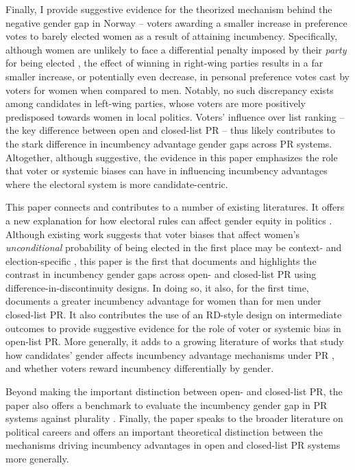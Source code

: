 \documentclass[12pt]{article}
\begin{document}
Finally, I provide suggestive evidence for the theorized mechanism behind the negative gender gap in Norway -- voters awarding a smaller increase in preference votes to barely elected women as a result of attaining incumbency.
Specifically, although women are unlikely to face a differential penalty imposed by their \emph{party} for being elected \citep{kjaer2019}, the effect of winning in right-wing parties results in a far smaller increase, or potentially even decrease, in personal preference votes cast by voters for women when compared to men. Notably, no such discrepancy exists among candidates in left-wing parties, whose voters are more positively predisposed towards women in local politics. Voters' influence over list ranking -- the key difference between open and closed-list PR -- thus likely contributes to the stark difference in incumbency advantage gender gaps across PR systems. Altogether, although suggestive, the evidence in this paper emphasizes the role that voter or systemic biases can have in influencing incumbency advantages where the electoral system is more candidate-centric.

This paper connects and contributes to a number of existing literatures. It offers a new explanation for how electoral rules can affect gender equity in politics \citep{krook2014,obrien2016,krook2018,luhiste2015}.
Although existing work suggests that voter biases that affect women's \emph{unconditional} probability of being elected in the first place may be context- and election-specific \citep{folke2016a, anzia2019, beaman2009,broockman2020,eymmoud2017}, this paper is the first that documents and highlights the contrast in incumbency gender gaps across open- and closed-list PR using difference-in-discontinuity designs. In doing so, it also, for the first time, documents a greater incumbency advantage for women than for men under closed-list PR. It also contributes the use of an RD-style design on intermediate outcomes to provide suggestive evidence for the role of voter or systemic bias in open-list PR. More generally, it adds to a growing literature of works that study how candidates' gender affects incumbency advantage mechanisms under PR \citep{schwindt-bayer2005,jankowski2019,smrek2020}, and whether voters reward incumbency differentially by gender.

Beyond making the important distinction between open- and closed-list PR, the paper also offers a benchmark to evaluate the incumbency gender gap in PR systems against plurality \citep{wasserman2020, cipullo2021, brown2019}. Finally, the paper speaks to the broader literature on political careers \citep{cirone2020,kerevel2019,folke2014} and offers an important theoretical distinction between the mechanisms driving incumbency advantages in open and closed-list PR systems more generally.
\end{document}
